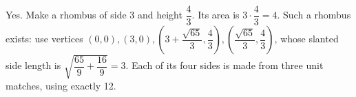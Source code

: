 Yes. Make a rhombus of side 3 and height $\dfrac{4}{3}$. Its area is $3\cdot\dfrac{4}{3}=4$. Such a rhombus exists: use vertices $(0,0),(3,0),(3+\dfrac{\sqrt{65}}{3},\dfrac{4}{3}),(\dfrac{\sqrt{65}}{3},\dfrac{4}{3})$, whose slanted side length is $\sqrt{\dfrac{65}{9}+\dfrac{16}{9}}=3$. Each of its four sides is made from three unit matches, using exactly 12.
